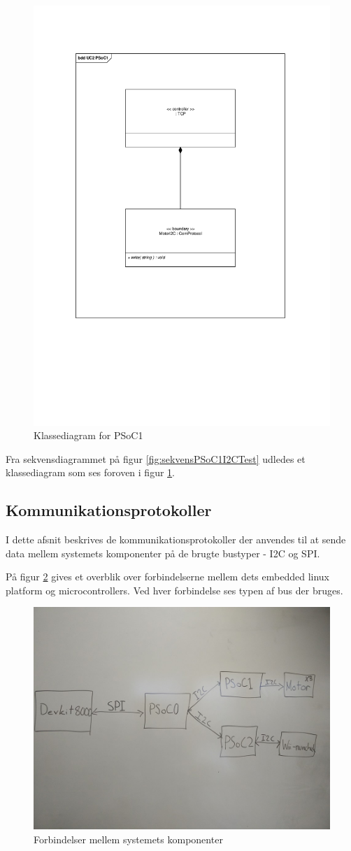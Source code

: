 \begin{figure}[H]
	\centering
	\includegraphics[width=.5\textwidth]{Systemarkitektur/images/klassediagramPSoC1}
	\caption{Klassediagram for PSoC1}
	\label{fig:klassePSoC1}
\end{figure}

Fra sekvensdiagrammet på figur \ref{fig:sekvensPSoC1I2CTest} udledes et klassediagram som ses foroven i figur \ref{fig:klassePSoC1}.

\subsection{Kommunikationsprotokoller}

I dette afsnit beskrives de kommunikationsprotokoller der anvendes til at sende data mellem systemets komponenter på de brugte bustyper - I2C og SPI.

På figur \ref{fig:kommunikationsOverblik} gives et overblik over forbindelserne mellem dets embedded linux platform og microcontrollers. Ved hver forbindelse ses typen af bus der bruges.

\begin{figure}[H]
	\centering
	\includegraphics[width=\textwidth] {Systemarkitektur/images/overordnetstruktur}
	\caption{Forbindelser mellem systemets komponenter}
	\label{fig:kommunikationsOverblik}
\end{figure}

